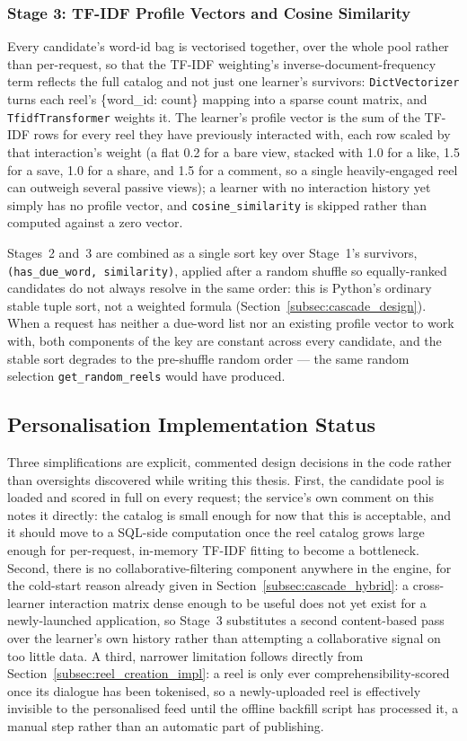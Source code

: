         \subsubsection{Stage 3: TF-IDF Profile Vectors and Cosine Similarity}
        Every candidate's word-id bag is vectorised together, over the whole pool rather than per-request, so that the TF-IDF weighting's inverse-document-frequency term reflects the full catalog and not just one learner's survivors: \texttt{DictVectorizer} turns each reel's \{word\_id: count\} mapping into a sparse count matrix, and \texttt{TfidfTransformer} weights it. The learner's profile vector is the sum of the TF-IDF rows for every reel they have previously interacted with, each row scaled by that interaction's weight (a flat 0.2 for a bare view, stacked with 1.0 for a like, 1.5 for a save, 1.0 for a share, and 1.5 for a comment, so a single heavily-engaged reel can outweigh several passive views); a learner with no interaction history yet simply has no profile vector, and \texttt{cosine\_similarity} is skipped rather than computed against a zero vector.

        Stages~2 and~3 are combined as a single sort key over Stage~1's survivors, \texttt{(has\_due\_word, similarity)}, applied after a random shuffle so equally-ranked candidates do not always resolve in the same order: this is Python's ordinary stable tuple sort, not a weighted formula (Section~\ref{subsec:cascade_design}). When a request has neither a due-word list nor an existing profile vector to work with, both components of the key are constant across every candidate, and the stable sort degrades to the pre-shuffle random order --- the same random selection \texttt{get\_random\_reels} would have produced.

    \subsection{Personalisation Implementation Status}
    \label{subsec:personalisation_status}
    Three simplifications are explicit, commented design decisions in the code rather than oversights discovered while writing this thesis. First, the candidate pool is loaded and scored in full on every request; the service's own comment on this notes it directly: the catalog is small enough for now that this is acceptable, and it should move to a SQL-side computation once the reel catalog grows large enough for per-request, in-memory TF-IDF fitting to become a bottleneck. Second, there is no collaborative-filtering component anywhere in the engine, for the cold-start reason already given in Section~\ref{subsec:cascade_hybrid}: a cross-learner interaction matrix dense enough to be useful does not yet exist for a newly-launched application, so Stage~3 substitutes a second content-based pass over the learner's own history rather than attempting a collaborative signal on too little data. A third, narrower limitation follows directly from Section~\ref{subsec:reel_creation_impl}: a reel is only ever comprehensibility-scored once its dialogue has been tokenised, so a newly-uploaded reel is effectively invisible to the personalised feed until the offline backfill script has processed it, a manual step rather than an automatic part of publishing.


